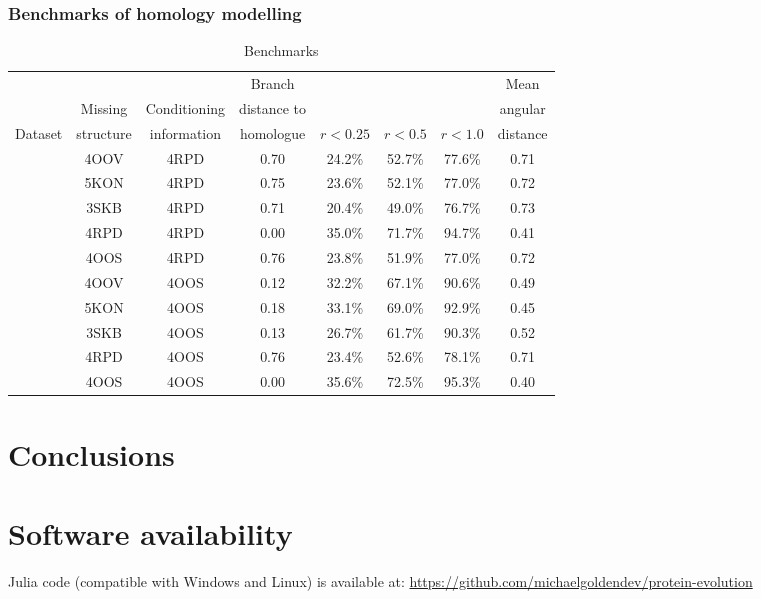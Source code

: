 \documentclass[nogrid]{MBE}%
\begin{document}
\subsubsection{Benchmarks of homology modelling}
\begin{table}%
	\centering
	\caption{\label{tab:benchmarkshomology} Benchmarks}
	\begin{tabularx}{1.0\linewidth}{lccccccc}
		\toprule 
		 & & & Branch & & & & Mean \\
		 & Missing  & Conditioning &  distance to &  & & & angular\\
		Dataset & structure & information &  homologue & $r < 0.25$ & $r < 0.5$  & $r < 1.0$ & distance\\
		\midrule
 		& 4OOV & 4RPD & 0.70 & 24.2\% & 52.7\% & 77.6\% & 0.71\\
 		& 5KON & 4RPD & 0.75 & 23.6\% & 52.1\% & 77.0\% & 0.72\\
 		& 3SKB & 4RPD & 0.71 & 20.4\% & 49.0\% & 76.7\% & 0.73\\
 		& 4RPD & 4RPD & 0.00 & 35.0\% & 71.7\% & 94.7\% & 0.41\\
 		& 4OOS & 4RPD & 0.76 & 23.8\% & 51.9\% & 77.0\% & 0.72\\
		& 4OOV & 4OOS & 0.12 & 32.2\% & 67.1\% & 90.6\% & 0.49\\
 		& 5KON & 4OOS & 0.18 & 33.1\% & 69.0\% & 92.9\% & 0.45\\
 		& 3SKB & 4OOS & 0.13 & 26.7\% & 61.7\% & 90.3\% & 0.52\\
 		& 4RPD & 4OOS & 0.76 & 23.4\% & 52.6\% & 78.1\% & 0.71\\
 		& 4OOS & 4OOS & 0.00 & 35.6\% & 72.5\% & 95.3\% & 0.40\\
		\bottomrule
	\end{tabularx}
\end{table}
	
\section{Conclusions}

\section{Software availability}
Julia code (compatible with Windows and Linux) is available at: \href{https://github.com/michaelgoldendev/protein-evolution}{https://github.com/michaelgoldendev/protein-evolution}
\end{document}
